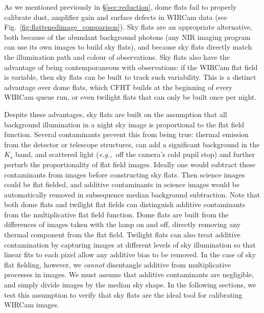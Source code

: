 \documentclass[iop]{emulateapj}
\newcommand{\eg}{\textit{e.g.,~}}
\newcommand{\Fig}[1]{Fig.~\ref{fig:#1}}  %
\newcommand{\Sec}[1]{\S\ref{sec:#1}}  %
\begin{document}
As we mentioned previously in \Sec{reduction}, dome flats fail to properly calibrate dust, amplifier gain and surface defects in WIRCam data (see \Fig{flattenedimage_comparison}).
Sky flats are an appropriate alternative, both because of the abundant background photons (any NIR imaging program can use its own images to build sky flats), and because sky flats directly match the illumination path and colour of observations.
Sky flats also have the advantage of being contemporaneous with observations: if the WIRCam flat field is variable, then sky flats can be built to track such variability.
This is a distinct advantage over dome flats, which CFHT builds at the beginning of every WIRCam queue run, or even twilight flats that can only be built once per night.

Despite these advantages, sky flats are built on the assumption that all background illumination in a night sky image is proportional to the flat field function.
Several contaminants prevent this from being true: thermal emission from the detector or telescope structures, can add a significant background in the $K_s$ band, and scattered light (\eg off the camera's cold pupil stop) and further perturb the proportionality of flat field images.
Ideally one would subtract these contaminants from images before constructing sky flats.
Then science images could be flat fielded, and additive contaminants in science images would be automatically removed in subsequence median background subtraction.
Note that both dome flats and twilight flat fields can distinguish additive contaminants from the multiplicative flat field function.
Dome flats are built from the differences of images taken with the lamp on and off, directly removing any thermal component from the flat field.
Twilight flats can also treat additive contamination by capturing images at different levels of sky illumination so that linear fits to each pixel allow any additive bias to be removed.
In the case of sky flat fielding, however, we \emph{cannot} disentangle additive from multiplicative processes in images.
We must assume that additive contaminants are negligible, and simply divide images by the median sky shape.
In the following sections, we test this assumption to verify that sky flats are the ideal tool for calibrating WIRCam images.
\end{document}
